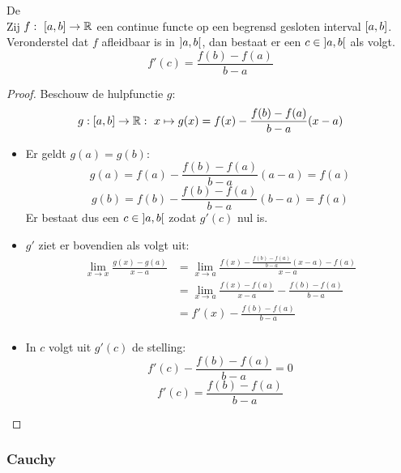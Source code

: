 \documentclass[main.tex]{subfiles}
\begin{document}
\begin{st}
  \label{st:middelwaardestelling-lagrange}
  De \\
  Zij $f:\ \interval{a}{b} \rightarrow \mathbb{R}$ een continue functe op een begrensd gesloten interval $\interval{a}{b}$.
  Veronderstel dat $f$ afleidbaar is in $\interval[open]{a}{b}$, dan bestaat er een $c\in \interval[open]{a}{b}$ als volgt.
  \[ f'(c) = \frac{f(b)-f(a)}{b-a} \]

  \begin{proof}
   Beschouw de hulpfunctie $g$:
   \[ g: \interval{a}{b} \rightarrow \mathbb{R}:\ x \mapsto g(x) = f(x)-\frac{f(b)-f(a)}{b-a}(x-a) \]
   \begin{itemize}
   \item Er geldt $g(a) = g(b)$:
     \[ g(a) = f(a)-\frac{f(b)-f(a)}{b-a}(a-a) = f(a) \]
     \[ g(b) = f(b)-\frac{f(b)-f(a)}{b-a}(b-a) = f(a) \]
     Er bestaat dus een $c\in \interval[open]{a}{b}$ zodat $g'(c)$ nul is.
   \item $g'$ ziet er bovendien als volgt uit:
     \[
     \begin{array}{rl}
       \lim_{x \rightarrow x}\frac{g(x)-g(a)}{x-a}
       &= \lim_{x \rightarrow a}\frac{f(x)-\frac{f(b)-f(a)}{b-a}(x-a) - f(a)}{x-a}\\
       &= \lim_{x \rightarrow a} \frac{f(x)-f(a)}{x-a} - \frac{f(b)-f(a)}{b-a}\\
       &= f'(x)-\frac{f(b)-f(a)}{b-a}\\
     \end{array}
     \]
   \item In $c$ volgt uit $g'(c)$ de stelling:
     \[
     f'(c)-\frac{f(b)-f(a)}{b-a} = 0 
     \]
     \[
     f'(c) = \frac{f(b)-f(a)}{b-a} 
     \]
   \end{itemize}
  \end{proof}
\feed
\end{st}


\subsubsection{Cauchy}
\label{sec:cauchy}
\end{document}
